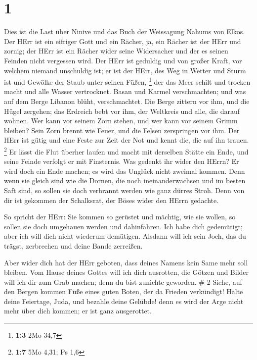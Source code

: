 \hypertarget{section}{%
\section{1}\label{section}}

 Dies ist die Last über Ninive und das Buch der Weissagung
Nahums von Elkos.  Der HErr ist ein eifriger Gott und ein
Rächer, ja, ein Rächer ist der HErr und zornig; der HErr ist ein Rächer
wider seine Widersacher und der es seinen Feinden nicht vergessen wird.
 Der HErr ist geduldig und von großer Kraft, vor welchem
niemand unschuldig ist; er ist der HErr, des Weg in Wetter und Sturm ist
und Gewölke der Staub unter seinen Füßen, \footnote{\textbf{1:3} 2Mo
  34,7}  der das Meer schilt und trocken macht und alle
Wasser vertrocknet. Basan und Karmel verschmachten; und was auf dem
Berge Libanon blüht, verschmachtet.  Die Berge zittern vor
ihm, und die Hügel zergehen; das Erdreich bebt vor ihm, der Weltkreis
und alle, die darauf wohnen.  Wer kann vor seinem Zorn
stehen, und wer kann vor seinem Grimm bleiben? Sein Zorn brennt wie
Feuer, und die Felsen zerspringen vor ihm.  Der HErr ist
gütig und eine Feste zur Zeit der Not und kennt die, die auf ihn trauen.
\footnote{\textbf{1:7} 5Mo 4,31; Ps 1,6}  Er lässt die Flut
überher laufen und macht mit derselben Stätte ein Ende, und seine Feinde
verfolgt er mit Finsternis.  Was gedenkt ihr wider den
HErrn? Er wird doch ein Ende machen; es wird das Unglück nicht zweimal
kommen.  Denn wenn sie gleich sind wie die Dornen, die noch
ineinanderwachsen und im besten Saft sind, so sollen sie doch verbrannt
werden wie ganz dürres Stroh.  Denn von dir ist gekommen
der Schalksrat, der Böses wider den HErrn gedachte.

 So spricht der HErr: Sie kommen so gerüstet und mächtig,
wie sie wollen, so sollen sie doch umgehauen werden und dahinfahren. Ich
habe dich gedemütigt; aber ich will dich nicht wiederum demütigen.
 Alsdann will ich sein Joch, das du trägst, zerbrechen und
deine Bande zerreißen.

 Aber wider dich hat der HErr geboten, dass deines Namens
kein Same mehr soll bleiben. Vom Hause deines Gottes will ich dich
ausrotten, die Götzen und Bilder will ich dir zum Grab machen; denn du
bist zunichte geworden. \# 2  Siehe, auf den Bergen kommen
Füße eines guten Boten, der da Frieden verkündigt! Halte deine
Feiertage, Juda, und bezahle deine Gelübde! denn es wird der Arge nicht
mehr über dich kommen; er ist ganz ausgerottet.


